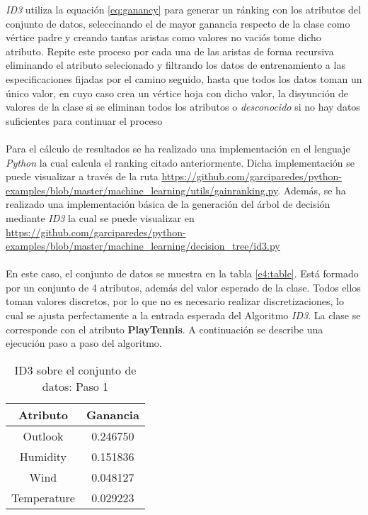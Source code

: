 \documentclass[10pt, a4paper,spanish]{article}
\begin{document}
		\begin{algorithm}
			\emph{ID3} utiliza la equación \eqref{eq:ganancy} para generar un ránking con los atributos del conjunto de datos, seleccinando el de mayor ganancia respecto de la clase como vértice padre y creando tantas aristas como valores no vaciós tome dicho atributo. Repite este proceso por cada una de las aristas de forma recursiva eliminando el atributo selecionado y filtrando los datos de entrenamiento a las especificaciones fijadas por el camino seguido, hasta que todos los datos toman un único valor, en cuyo caso crea un vértice hoja con dicho valor, la disyunción de valores de la clase si se eliminan todos los atributos o \emph{desconocido} si no hay datos suficientes para continuar el proceso
		\end{algorithm}

		\paragraph{}
		Para el cálculo de resultados se ha realizado una implementación en el lenguaje \emph{Python} la cual calcula el ranking citado anteriormente. Dicha implementación se puede visualizar a través de la ruta \url{https://github.com/garciparedes/python-examples/blob/master/machine_learning/utils/gainranking.py}\cite{github:garciparedes-python-examples}. Además, se ha realizado una implementación básica de la generación del árbol de decisión mediante \emph{ID3} la cual se puede visualizar en \url{https://github.com/garciparedes/python-examples/blob/master/machine_learning/decision_tree/id3.py}\cite{github:garciparedes-python-examples}


		\paragraph{}
		En este caso, el conjunto de datos se muestra en la tabla \ref{e4:table}. Está formado por un conjunto de 4 atributos, además del valor esperado de la clase. Todos ellos toman valores discretos, por lo que no es necesario realizar discretizaciones, lo cual se ajusta perfectamente a la entrada esperada del Algoritmo \emph{ID3}. La clase se corresponde con el atributo \textbf{PlayTennis}. A continuación se describe una ejecución paso a paso del algoritmo.

		\begin{table}[H]
			\centering
			\begin{tabular}{| c | c |}
				\hline
	 			Atributo 			& Ganancia \\ \hline
				Outlook 			& 0.246750 \\ \hline
				Humidity 			& 0.151836 \\ \hline
				Wind 					& 0.048127 \\ \hline
				Temperature 	& 0.029223 \\ \hline
			\end{tabular}
			\caption{ID3 sobre el conjunto de datos: Paso 1}
			\label{e4:algorithm-step1}
		\end{table}
\end{document}
